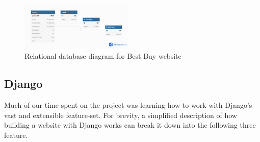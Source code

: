 \documentclass[sigconf]{acmart}
\begin{document}
\begin{figure} [H] %
	\centering %
	\includegraphics[width=0.48\textwidth]{Figures/databaseRelations} %
	\caption{Relational database diagram for Best Buy website}
\end{figure}

\subsection{Django}\label{django}
Much of our time spent on the project was learning how to work with Django's vast and extensible feature-set. For brevity, a simplified description of how building a website with Django works can break it down into the following three feature.
\end{document}
